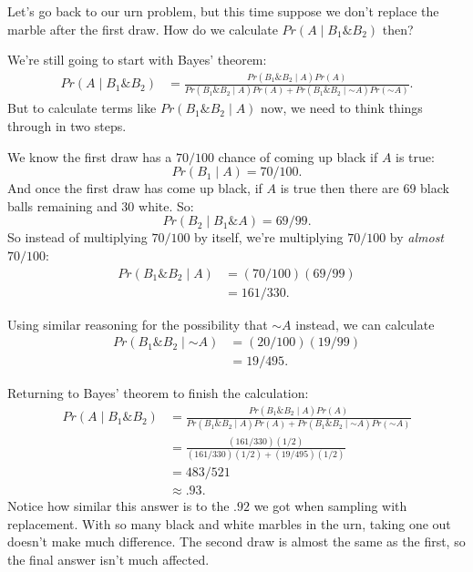 \documentclass[justified]{tufte-book}
\newcommand{\given}{\mid}
\renewcommand{\neg}{\mathbin{\sim}}
\renewcommand{\wedge}{\mathbin{\&}}
\newcommand{\p}{Pr}
\theoremstyle{definition}
\theoremstyle{definition}
\theoremstyle{definition}
\theoremstyle{remark}
\begin{document}
Let's go back to our urn problem, but this time suppose we don't replace the marble after the first draw. How do we calculate \(\p(A \given B_1 \wedge B_2)\) then?

We're still going to start with Bayes' theorem:
\[
  \begin{aligned}
    \p(A \given B_1 \wedge B_2) &= \frac{\p(B_1 \wedge B_2 \given A)\p(A)}{\p(B_1 \wedge B_2 \given A) \p(A) + \p(B_1 \wedge B_2 \given \neg A) \p(\neg A)}.
  \end{aligned}
\]
But to calculate terms like \(\p(B_1 \wedge B_2 \given A)\) now, we need to think things through in two steps.

We know the first draw has a \(70/100\) chance of coming up black if \(A\) is true:
\[ \p(B_1 \given A) = 70/100. \]
And once the first draw has come up black, if \(A\) is true then there are 69 black balls remaining and 30 white. So:
\[ \p(B_2 \given B_1 \wedge A) = 69/99. \]
So instead of multiplying \(70/100\) by itself, we're multiplying \(70/100\) by \emph{almost} \(70/100\):
\[
  \begin{aligned}
    \p(B_1 \wedge B_2 \given A) &= (70/100)(69/99)\\
       &= 161/330.
  \end{aligned}
\]

Using similar reasoning for the possibility that \(\neg A\) instead, we can calculate
\[
  \begin{aligned}
    \p(B_1 \wedge B_2 \given \neg A) &= (20/100)(19/99)\\
       &= 19/495.
  \end{aligned}
\]

Returning to Bayes' theorem to finish the calculation:
\[
  \begin{aligned}
    \p(A \given B_1 \wedge B_2) &= \frac{\p(B_1 \wedge B_2 \given A)\p(A)}{\p(B_1 \wedge B_2 \given A) \p(A) + \p(B_1 \wedge B_2 \given \neg A) \p(\neg A)} \\
      &= \frac{(161/330)(1/2)}{(161/330)(1/2) + (19/495)(1/2)} \\
      &= 483/521 \\
      &\approx .93. 
  \end{aligned}
\]
Notice how similar this answer is to the \(.92\) we got when sampling with replacement. With so many black and white marbles in the urn, taking one out doesn't make much difference. The second draw is almost the same as the first, so the final answer isn't much affected.
\end{document}
